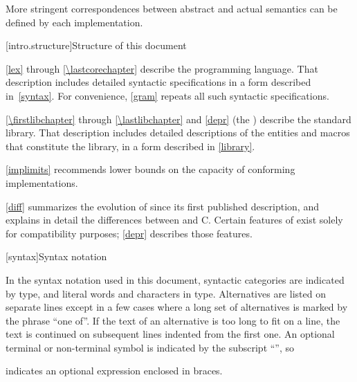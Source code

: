 \begin{note}
More stringent correspondences between abstract and actual
semantics can be defined by each implementation.
\end{note}
%

[intro.structure]{Structure of this document}

\pnum
{}%
%
\ref{lex} through \ref{\lastcorechapter} describe the \Cpp{} programming
language. That description includes detailed syntactic specifications in
a form described in~\ref{syntax}. For convenience, \ref{gram}
repeats all such syntactic specifications.

\pnum
\ref{\firstlibchapter} through \ref{\lastlibchapter} and \ref{depr}
(the ) describe the \Cpp{} standard library.
That description includes detailed descriptions of the
entities and macros
that constitute the library, in a form described in \ref{library}.

\pnum
\ref{implimits} recommends lower bounds on the capacity of conforming
implementations.

\pnum
\ref{diff} summarizes the evolution of \Cpp{} since its first
published description, and explains in detail the differences between
\Cpp{} and C\@. Certain features of \Cpp{} exist solely for compatibility
purposes; \ref{depr} describes those features.

[syntax]{Syntax notation}

\pnum
{}%
In the syntax notation used in this document, syntactic
categories are indicated by  type, and literal words
and characters in   type. Alternatives are
listed on separate lines except in a few cases where a long set of
alternatives is marked by the phrase ``one of''. If the text of an alternative is too long to fit on a line, the text is continued on subsequent lines indented from the first one.
An optional terminal or non-terminal symbol is indicated by the subscript
``\opt{\relax}'', so
\begin{ncbnf}
\terminal{\{}  \terminal{\}}
\end{ncbnf}
indicates an optional expression enclosed in braces.%

